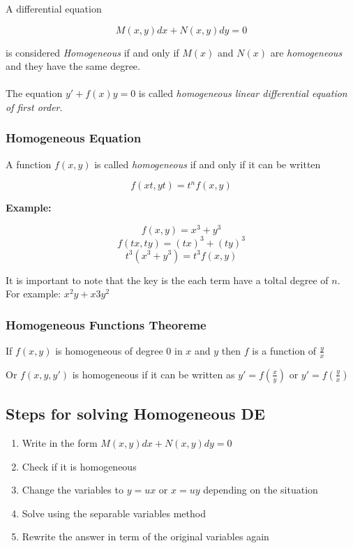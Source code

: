 A differential equation 

\[M(x,y)dx + N(x,y)dy = 0\]

is considered \emph{Homogeneous} if and only if
\(M(x)\) and \(N(x)\) are \emph{homogeneous} and they have the same degree.
\\\\
The equation \(y' + f(x)y = 0\) is called \emph{homogeneous linear differential equation of first order}.

\subsubsection{Homogeneous Equation}

A function \(f(x,y)\) is called \emph{homogeneous} if and only if it can be written

\[f(xt, yt) = t^n f(x,y)\]

\textbf{Example: }

\[f(x,y) = x^3 + y^3\]
\[f(tx, ty) = (tx)^3 + (ty)^3\]
\[t^3 (x^3 + y^3) = t^3 f(x,y)\]

It is important to note that the key is the each term have a toltal degree of \(n\).
For example: \(x^2y + x3y^2\)

\subsubsection{Homogeneous Functions Theoreme}

If \(f(x,y)\) is homogeneous of degree \(0\) in \(x\) and \(y\) then 
\(f\) is a function of \(\frac{y}{x}\)

Or \(f(x,y,y')\) is homogeneous if it can be written as \(y' = f(\frac{x}{y})\) or \(y' = f(\frac{y}{x})\)

\subsection{Steps for solving Homogeneous DE}

\begin{enumerate}
    \item Write in the form \(M(x,y)dx + N(x,y)dy = 0\)
    \item Check if it is homogeneous
    \item Change the variables to \(y = ux\) or \(x = uy\) depending on the situation
    \item Solve using the separable variables method
    \item Rewrite the answer in term of the original variables again
\end{enumerate}

